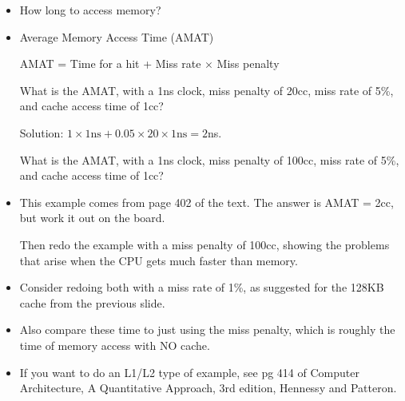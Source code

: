 \begin{frame}[fragile]
\begin{itemize}
\item How long to access memory?
\item Average Memory Access Time (AMAT)

	AMAT = Time for a hit + Miss rate $\times$ Miss penalty
 \begin{tcolorbox}[enhanced,attach boxed title to top center={yshift=-3mm,yshifttext=-1mm},
  colback=blue!5!white,colframe=blue!75!black,colbacktitle=blue!80!black,
  title=Think About It,fonttitle=\bfseries,
  boxed title style={size=small,colframe=red!50!black} ]
	What is the AMAT, with a 1ns clock, miss penalty of 20cc, miss rate of 5\%, and cache access time of 1cc?
\end{tcolorbox}

Solution: $1\times 1\text{ns} + 0.05 \times 20 \times 1 \text{ns} = 2$ns.
\begin{tcolorbox}[enhanced,attach boxed title to top center={yshift=-3mm,yshifttext=-1mm},
  colback=red!5!white,colframe=red!75!black,colbacktitle=red!80!black,
  title=Try this,fonttitle=\bfseries,
  boxed title style={size=small,colframe=red!50!black} ]
What is the AMAT, with a 1ns clock, miss penalty of 100cc, miss rate of 5\%, and cache access time of 1cc?

  \end{tcolorbox}


\end{itemize}

\BNotes\ifnum{}
\begin{itemize}
	\item This example comes from page 402 of the text.
		The answer is AMAT = 2cc, but work it out on the
		board.
	
		Then redo the example with a miss penalty of 100cc,
		showing the problems that arise when the CPU gets
		much faster than memory.
	\item Consider redoing both with a miss rate of 1\%, as suggested
		for the 128KB cache from the previous slide.

	\item Also compare these time to just using the miss penalty, which
		is roughly the time of memory access with NO cache.
	\item If you want to do an L1/L2 type of example, see pg 414 of
		Computer Architecture, A Quantitative Approach, 3rd edition,
		Hennessy and Patteron.


\end{itemize}
\end{frame}
